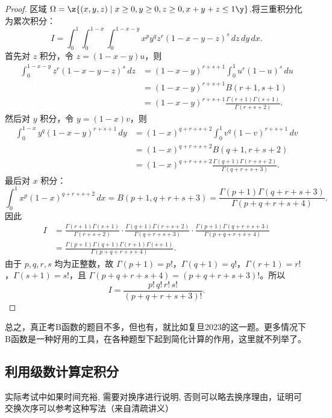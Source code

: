 \begin{proof}
区域 $\displaystyle \Omega = \z\{ (x,y,z) \mid x \ge 0, y \ge 0, z \ge 0, x+y+z \le 1 \y\}$.将三重积分化为累次积分：
\[
I = \int_{0}^{1} \int_{0}^{1-x} \int_{0}^{1-x-y} x^{p} y^{q} z^{r} (1-x-y-z)^{s} \, dz\,dy\,dx.
\]
首先对 $\displaystyle z$ 积分，令 $\displaystyle z = (1-x-y)u$，则
\begin{align*}
\int_{0}^{1-x-y} z^{r} (1-x-y-z)^{s} \, dz &= (1-x-y)^{r+s+1} \int_{0}^{1} u^{r} (1-u)^{s} \, du \\
&= (1-x-y)^{r+s+1} B(r+1, s+1) \\
&= (1-x-y)^{r+s+1} \frac{\Gamma(r+1)\Gamma(s+1)}{\Gamma(r+s+2)}.
\end{align*}
然后对 $\displaystyle y$ 积分，令 $\displaystyle y = (1-x)v$，则
\begin{align*}
\int_{0}^{1-x} y^{q} (1-x-y)^{r+s+1} \, dy &= (1-x)^{q+r+s+2} \int_{0}^{1} v^{q} (1-v)^{r+s+1} \, dv \\
&= (1-x)^{q+r+s+2} B(q+1, r+s+2) \\
&= (1-x)^{q+r+s+2} \frac{\Gamma(q+1)\Gamma(r+s+2)}{\Gamma(q+r+s+3)}.
\end{align*}
最后对 $\displaystyle x$ 积分：
\[
\int_{0}^{1} x^{p} (1-x)^{q+r+s+2} \, dx = B(p+1, q+r+s+3) = \frac{\Gamma(p+1)\Gamma(q+r+s+3)}{\Gamma(p+q+r+s+4)}.
\]
因此
\begin{align*}
I &= \frac{\Gamma(r+1)\Gamma(s+1)}{\Gamma(r+s+2)} \cdot \frac{\Gamma(q+1)\Gamma(r+s+2)}{\Gamma(q+r+s+3)} \cdot \frac{\Gamma(p+1)\Gamma(q+r+s+3)}{\Gamma(p+q+r+s+4)} \\
&= \frac{\Gamma(p+1)\Gamma(q+1)\Gamma(r+1)\Gamma(s+1)}{\Gamma(p+q+r+s+4)}.
\end{align*}
由于 $\displaystyle p,q,r,s$ 均为正整数，故 $\displaystyle \Gamma(p+1)=p!$，$\displaystyle \Gamma(q+1)=q!$，$\displaystyle \Gamma(r+1)=r!$，$\displaystyle \Gamma(s+1)=s!$，且 $\displaystyle \Gamma(p+q+r+s+4) = (p+q+r+s+3)!$。所以
\[
\boxed{\displaystyle I = \frac{p!\, q!\, r!\, s!}{(p+q+r+s+3)!}}.
\]
\end{proof}

\vspace{4mm}
总之，真正考B函数的题目不多，但也有，就比如复旦2023的这一题。更多情况下B函数是一种好用的工具，在各种题型下起到简化计算的作用，这里就不列举了。




\newpage

\subsection{利用级数计算定积分}
实际考试中如果时间充裕, 需要对换序进行说明, 否则可以略去换序理由，证明可交换次序可以参考这种写法（来自清疏讲义）

